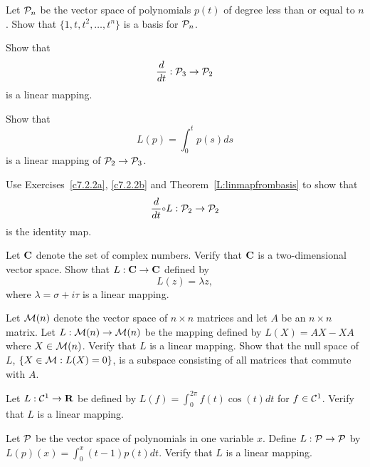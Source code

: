 \begin{exercise}  \label{c7.2.2}
Let ${\cal P}_n$ be the vector space of polynomials $p(t)$ of
degree less than or equal to $n$.  Show that $\{1,t,t^2,\ldots,t^n\}$ is a
basis for ${\cal P}_n$.
\end{exercise}

\begin{exercise}  \label{c7.2.2a}
Show that
\[
\frac{d}{dt}:{\cal P}_3\to{\cal P}_2
\]
is a linear mapping.
\end{exercise}
\begin{exercise}  \label{c7.2.2b}
Show that
\[
L(p) = \int_0^tp(s)ds
\]
is a linear mapping of ${\cal P}_2\to{\cal P}_3$.
\end{exercise}
\begin{exercise}  \label{c7.2.2c}
Use Exercises~\ref{c7.2.2a}, \ref{c7.2.2b} and
Theorem~\ref{L:linmapfrombasis} to show that
\[
\frac{d}{dt}\compose L:{\cal P}_2\to{\cal P}_2
\]
is the identity map.
\end{exercise}

\begin{exercise} \label{c7.2.3}
Let $\mbox{$\bf{C}$}$ denote the set of complex numbers.  Verify that
$\mbox{$\bf{C}$}$ is a two-dimensional vector space.  Show that $L:\mbox{$\bf{C}$}\to\mbox{$\bf{C}$}$
defined by
\[
L(z) = \lambda z,
\]
where $\lambda=\sigma+i\tau$ is a linear mapping.
\end{exercise}

\begin{exercise} \label{c7.2.4}
Let ${\cal M}(n)$ denote the vector space of $n\times n$
matrices and let $A$ be an $n\times n$ matrix.  Let
$L:{\cal M}(n)\to{\cal M}(n)$ be the mapping defined by
$L(X)=AX-XA$ where $X\in{\cal M}(n)$.  Verify that $L$ is
a linear mapping.  Show that the null space of $L$,
$\{X\in{\cal M}:L(X)=0\}$, is a subspace consisting of all
matrices that commute with $A$.
\end{exercise}

\begin{exercise} \label{c7.2.5}
Let $L:{\cal C}^1\to\mbox{$\bf{R}$}$ be defined by $L(f) = \int_0^{2\pi}f(t)\cos(t)dt$
for $f\in{\cal C}^1$.  Verify that $L$ is a linear mapping.
\end{exercise}

\begin{exercise} \label{c7.2.6}
Let ${\cal P}$ be the vector space of polynomials in one variable
$x$.  Define $L:{\cal P}\to {\cal P}$ by $L(p)(x)=\int_0^x(t-1)p(t)dt$.
Verify that $L$ is a linear mapping.
\end{exercise}


